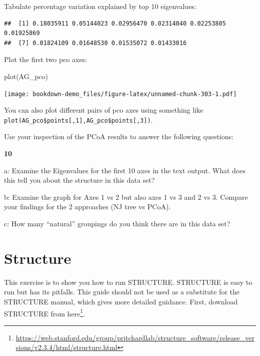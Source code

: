 \documentclass[
]{book}
\makeatletter
\newenvironment{Shaded}{\begin{snugshade}}{\end{snugshade}}
\newcommand{\DecValTok}[1]{\textcolor[rgb]{0.00,0.00,0.81}{#1}}
\newcommand{\FunctionTok}[1]{\textcolor[rgb]{0.00,0.00,0.00}{#1}}
\newcommand{\NormalTok}[1]{#1}
\newcommand{\OtherTok}[1]{\textcolor[rgb]{0.56,0.35,0.01}{#1}}
\newcommand{\SpecialCharTok}[1]{\textcolor[rgb]{0.00,0.00,0.00}{#1}}
\renewcommand{\href}[2]{#2\footnote{\url{#1}}}
\newenvironment{kframe}{%
\medskip{}
\setlength{\fboxsep}{.8em}
 \def\at@end@of@kframe{}%
 \ifinner\ifhmode%
  \def\at@end@of@kframe{\end{minipage}}%
  \begin{minipage}{\columnwidth}%
 \fi\fi%
 \def\FrameCommand##1{\hskip\@totalleftmargin \hskip-\fboxsep
 \colorbox{shadecolor}{##1}\hskip-\fboxsep
     \hskip-\linewidth \hskip-\@totalleftmargin \hskip\columnwidth}%
 \MakeFramed {\advance\hsize-\width
   \@totalleftmargin\z@ \linewidth\hsize
   \@setminipage}}%
 {\par\unskip\endMakeFramed%
 \at@end@of@kframe}
\newenvironment{rmdblock}[1]
  {
  \begin{itemize}
  \renewcommand{\labelitemi}{
    \raisebox{-.7\height}[0pt][0pt]{
      {\setkeys{Gin}{width=3em,keepaspectratio}\texttt{[image: images/\#1]}}
    }
  }
  \setlength{\fboxsep}{1em}
  \begin{kframe}
  \item
  }
  {
  \end{kframe}
  \end{itemize}
  }
\newenvironment{rmdquiz}
  {\begin{rmdblock}{quiz}}
  {\end{rmdblock}}
\makeatother
\begin{document}
Tabulate percentage variation explained by top 10 eigenvalues:

\begin{Shaded}
\end{Shaded}

\begin{verbatim}
##  [1] 0.18035911 0.05144023 0.02956470 0.02314040 0.02253805 0.01925869
##  [7] 0.01824109 0.01648530 0.01535072 0.01433016
\end{verbatim}

Plot the first two pco axes:

\begin{Shaded}
\begin{Highlighting}[]
\FunctionTok{plot}\NormalTok{(AG\_pco)}
\end{Highlighting}
\end{Shaded}

\texttt{[image: bookdown-demo\_files/figure-latex/unnamed-chunk-303-1.pdf]}

You can also plot different pairs of pco axes using something like \texttt{plot(AG\_pco\$points{[},1{]},AG\_pco\$points{[},3{]})}.

Use your inspection of the PCoA results to answer the following questions:

\begin{rmdquiz}
\textbf{10}

a: Examine the Eigenvalues for the first 10 axes in the text output. What does this tell you about the structure in this data set?

b: Examine the graph for Axes 1 vs 2 but also axes 1 vs 3 and 2 vs 3. Compare your findings for the 2 approaches (NJ tree vs PCoA).

c: How many ``natural'' groupings do you think there are in this data set?
\end{rmdquiz}

\hypertarget{structure}{%
\section{Structure}\label{structure}}

This exercise is to show you how to run STRUCTURE. STRUCTURE is easy to run but has its pitfalls. This guide should not be used as a substitute for the STRUCTURE manual, which gives more detailed guidance. First, download STRUCTURE from \href{https://web.stanford.edu/group/pritchardlab/structure_software/release_versions/v2.3.4/html/structure.html}{here}.
\end{document}
